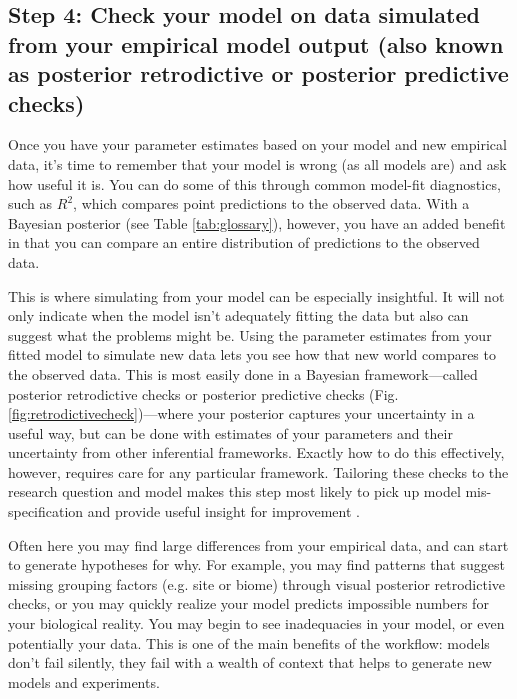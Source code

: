 \documentclass[11pt]{article}
\newcommand{\R}[1]{\label{}\linelabel{#1}}
\begin{document}
\subsection*{Step 4: Check your model on data simulated from your empirical model output (also known as posterior retrodictive or posterior predictive checks)} 

Once you have your parameter estimates based on your model and new empirical data, it's time to remember that your model is wrong (as all models are) and ask how useful it is. You can do some of this through common model-fit diagnostics, such as $R^2$, which compares point predictions to the observed data. With a Bayesian posterior (see Table \ref{tab:glossary}), however, you have an added benefit in that you can compare an entire distribution of predictions to the observed data. 

This is where simulating from your model can be especially insightful. It will not only indicate when the model isn't adequately fitting the data but also can suggest what the problems might be. Using the parameter estimates from your fitted model to simulate new data \citep[][]{held2010,gelman200ppc,conn2018} lets you see how that new world compares to the observed data. This is most easily done in a Bayesian framework---called posterior retrodictive checks or posterior predictive checks (Fig. \ref{fig:retrodictivecheck})---where your posterior captures your uncertainty in a useful way, but can be done with estimates of your parameters and their uncertainty from other inferential frameworks. \R{betterppcstart}Exactly how to do this effectively, however, requires care for any particular framework. Tailoring these checks to the research question and model makes this step most likely to pick up model mis-specification and provide useful insight for improvement \citep[e.g.,][]{mimno2015posterior}.\R{betterppcend}

Often here you may find large differences from your empirical data, and can start to generate hypotheses for why. For example, you may find patterns that suggest missing grouping factors (e.g. site or biome) through visual posterior retrodictive checks, or you may quickly realize your model predicts impossible numbers for your biological reality. You may begin to see inadequacies in your model, or even potentially your data.  This is one of the main benefits of the workflow: models don't fail silently, they fail with a wealth of context that helps to generate new models and experiments.
\end{document}
